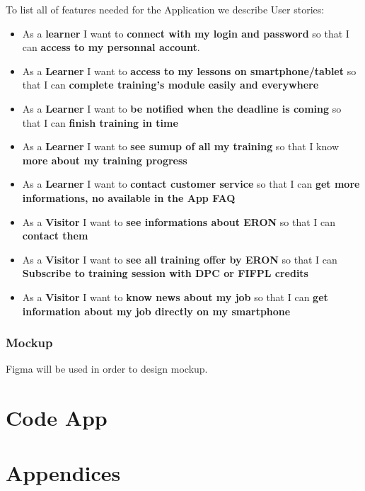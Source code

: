 \documentclass[
  12pt,
]{article}
\providecommand{\tightlist}{%
  \setlength{\itemsep}{0pt}\setlength{\parskip}{0pt}}
\begin{document}
To list all of features needed for the Application we describe User
stories:

\begin{itemize}
\tightlist
\item
  As a \textbf{learner} I want to \textbf{connect with my login and
  password} so that I can \textbf{access to my personnal account}.
\item
  As a \textbf{Learner} I want to \textbf{access to my lessons on
  smartphone/tablet} so that I can \textbf{complete training's module
  easily and everywhere}
\item
  As a \textbf{Learner} I want to \textbf{be notified when the deadline
  is coming} so that I can \textbf{finish training in time}
\item
  As a \textbf{Learner} I want to \textbf{see sumup of all my training}
  so that I know \textbf{more about my training progress}
\item
  As a \textbf{Learner} I want to \textbf{contact customer service} so
  that I can \textbf{get more informations, no available in the App FAQ}
\item
  As a \textbf{Visitor} I want to \textbf{see informations about ERON}
  so that I can \textbf{contact them}
\item
  As a \textbf{Visitor} I want to \textbf{see all training offer by
  ERON} so that I can \textbf{Subscribe to training session with DPC or
  FIFPL credits}
\item
  As a \textbf{Visitor} I want to \textbf{know news about my job} so
  that I can \textbf{get information about my job directly on my
  smartphone}
\end{itemize}

\hypertarget{mockup}{%
\subsubsection{Mockup}\label{mockup}}

Figma will be used in order to design mockup.

\hypertarget{code-app}{%
\section{Code App}\label{code-app}}

\hypertarget{appendices}{%
\section{Appendices}\label{appendices}}
\end{document}
